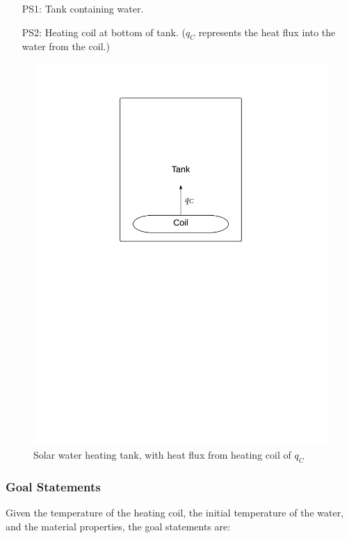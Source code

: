 \documentclass[12pt]{article}
\begin{document}
\begin{itemize}
\item[PS1:]Tank containing water.
\item[PS2:]Heating coil at bottom of tank. (${q_{C}}$ represents the heat flux into the water from the coil.)
\end{itemize}
\begin{figure}
\begin{center}
\includegraphics[width=\textwidth]{../../../datafiles/NoPCM/TankWaterOnly.png}
\caption{Solar water heating tank, with heat flux from heating coil of ${q_{C}}$}
\label{Figure:Tank}
\end{center}
\end{figure}
\subsubsection{Goal Statements}
\label{Sec:GoalStmt}
Given the temperature of the heating coil, the initial temperature of the water, and the material properties, the goal statements are:
\end{document}
